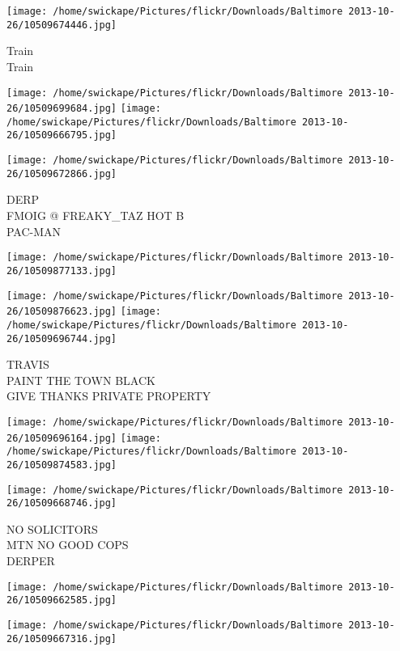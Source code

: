 \documentclass[10pt,letterpaper]{article}
\begin{document}
\vspace{0.25in}
\texttt{[image: /home/swickape/Pictures/flickr/Downloads/Baltimore 2013-10-26/10509674446.jpg]}

Train\\
Train\\
\pagebreak

\texttt{[image: /home/swickape/Pictures/flickr/Downloads/Baltimore 2013-10-26/10509699684.jpg]}
\texttt{[image: /home/swickape/Pictures/flickr/Downloads/Baltimore 2013-10-26/10509666795.jpg]}

\vspace{0.25in}
\texttt{[image: /home/swickape/Pictures/flickr/Downloads/Baltimore 2013-10-26/10509672866.jpg]}

DERP\\
FMOIG @ FREAKY\_TAZ HOT B\\
PAC{-}MAN\\
\pagebreak

\texttt{[image: /home/swickape/Pictures/flickr/Downloads/Baltimore 2013-10-26/10509877133.jpg]}

\vspace{0.25in}
\texttt{[image: /home/swickape/Pictures/flickr/Downloads/Baltimore 2013-10-26/10509876623.jpg]}
\texttt{[image: /home/swickape/Pictures/flickr/Downloads/Baltimore 2013-10-26/10509696744.jpg]}

TRAVIS\\
PAINT THE TOWN BLACK\\
GIVE THANKS PRIVATE PROPERTY\\
\pagebreak

\texttt{[image: /home/swickape/Pictures/flickr/Downloads/Baltimore 2013-10-26/10509696164.jpg]}
\texttt{[image: /home/swickape/Pictures/flickr/Downloads/Baltimore 2013-10-26/10509874583.jpg]}

\texttt{[image: /home/swickape/Pictures/flickr/Downloads/Baltimore 2013-10-26/10509668746.jpg]}

NO SOLICITORS\\
MTN NO GOOD COPS\\
DERPER\\
\pagebreak

\texttt{[image: /home/swickape/Pictures/flickr/Downloads/Baltimore 2013-10-26/10509662585.jpg]}

\vspace{0.25in}
\texttt{[image: /home/swickape/Pictures/flickr/Downloads/Baltimore 2013-10-26/10509667316.jpg]}
\end{document}

